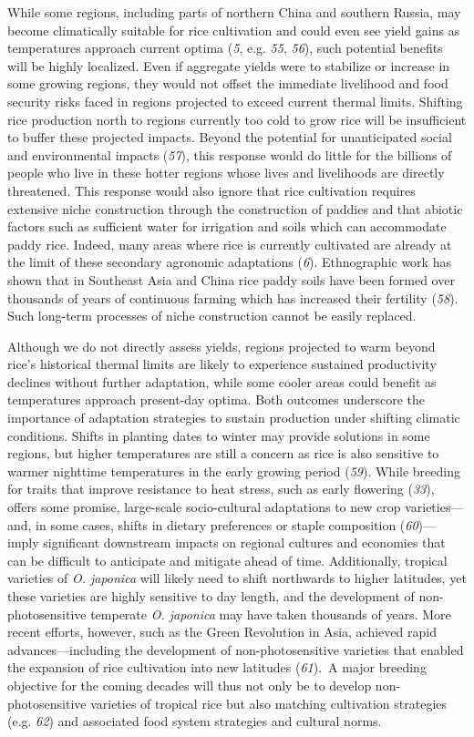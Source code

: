 \documentclass[
  letterpaper,
  DIV=11,
  numbers=noendperiod]{scrartcl}
\begin{document}
While some regions, including parts of northern China and southern
Russia, may become climatically suitable for rice cultivation and could
even see yield gains as temperatures approach current optima (\emph{5},
e.g. \emph{55}, \emph{56}), such potential benefits will be highly
localized. Even if aggregate yields were to stabilize or increase in
some growing regions, they would not offset the immediate livelihood and
food security risks faced in regions projected to exceed current thermal
limits. Shifting rice production north to regions currently too cold to
grow rice will be insufficient to buffer these projected impacts. Beyond
the potential for unanticipated social and environmental impacts
(\emph{57}), this response would do little for the billions of people
who live in these hotter regions whose lives and livelihoods are
directly threatened. This response would also ignore that rice
cultivation requires extensive niche construction through the
construction of paddies and that abiotic factors such as sufficient
water for irrigation and soils which can accommodate paddy rice. Indeed,
many areas where rice is currently cultivated are already at the limit
of these secondary agronomic adaptations (\emph{6}). Ethnographic work
has shown that in Southeast Asia and China rice paddy soils have been
formed over thousands of years of continuous farming which has increased
their fertility (\emph{58}). Such long-term processes of niche
construction cannot be easily replaced.

Although we do not directly assess yields, regions projected to warm
beyond rice's historical thermal limits are likely to experience
sustained productivity declines without further adaptation, while some
cooler areas could benefit as temperatures approach present-day optima.
Both outcomes underscore the importance of adaptation strategies to
sustain production under shifting climatic conditions. Shifts in
planting dates to winter may provide solutions in some regions, but
higher temperatures are still a concern as rice is also sensitive to
warmer nighttime temperatures in the early growing period (\emph{59}).
While breeding for traits that improve resistance to heat stress, such
as early flowering (\emph{33}), offers some promise, large-scale
socio-cultural adaptations to new crop varieties---and, in some cases,
shifts in dietary preferences or staple composition (\emph{60})---imply
significant downstream impacts on regional cultures and economies that
can be difficult to anticipate and mitigate ahead of time. Additionally,
tropical varieties of \emph{O. japonica} will likely need to shift
northwards to higher latitudes, yet these varieties are highly sensitive
to day length, and the development of non-photosensitive temperate
\emph{O. japonica} may have taken thousands of years. More recent
efforts, however, such as the Green Revolution in Asia, achieved rapid
advances---including the development of non-photosensitive varieties
that enabled the expansion of rice cultivation into new latitudes
(\emph{61}).~A major breeding objective for the coming decades will thus
not only be to develop non-photosensitive varieties of tropical rice but
also matching cultivation strategies (e.g. \emph{62}) and associated
food system strategies and cultural norms.
\end{document}
